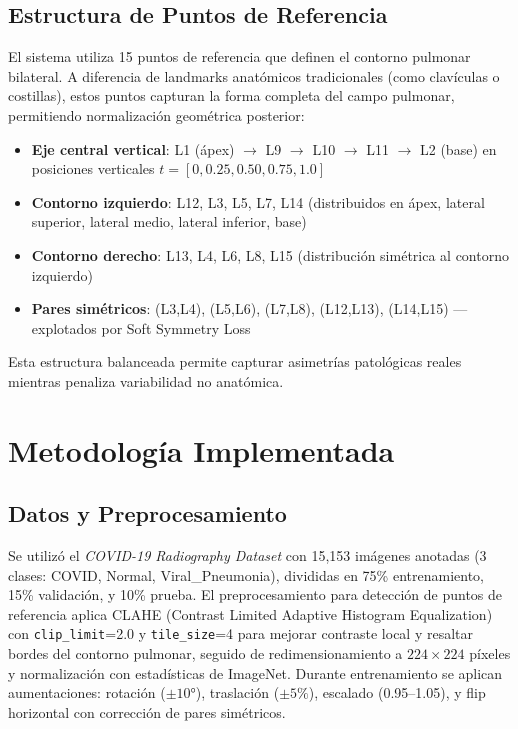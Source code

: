 \documentclass[12pt,a4paper]{article}
\newcommand{\code}[1]{\texttt{#1}}
\begin{document}
\subsection{Estructura de Puntos de Referencia}

El sistema utiliza 15 puntos de referencia que definen el contorno pulmonar bilateral. A diferencia de landmarks anatómicos tradicionales (como clavículas o costillas), estos puntos capturan la forma completa del campo pulmonar, permitiendo normalización geométrica posterior:

\begin{itemize}[itemsep=0pt]
    \item \textbf{Eje central vertical}: L1 (ápex) $\rightarrow$ L9 $\rightarrow$ L10 $\rightarrow$ L11 $\rightarrow$ L2 (base) en posiciones verticales $t=[0, 0.25, 0.50, 0.75, 1.0]$
    \item \textbf{Contorno izquierdo}: L12, L3, L5, L7, L14 (distribuidos en ápex, lateral superior, lateral medio, lateral inferior, base)
    \item \textbf{Contorno derecho}: L13, L4, L6, L8, L15 (distribución simétrica al contorno izquierdo)
    \item \textbf{Pares simétricos}: (L3,L4), (L5,L6), (L7,L8), (L12,L13), (L14,L15) — explotados por Soft Symmetry Loss
\end{itemize}

Esta estructura balanceada permite capturar asimetrías patológicas reales mientras penaliza variabilidad no anatómica.

\section{Metodología Implementada}

\subsection{Datos y Preprocesamiento}

Se utilizó el \textit{COVID-19 Radiography Dataset} con 15,153 imágenes anotadas (3 clases: COVID, Normal, Viral\_Pneumonia), divididas en 75\% entrenamiento, 15\% validación, y 10\% prueba. El preprocesamiento para detección de puntos de referencia aplica CLAHE (Contrast Limited Adaptive Histogram Equalization) con \code{clip\_limit}=2.0 y \code{tile\_size}=4 para mejorar contraste local y resaltar bordes del contorno pulmonar, seguido de redimensionamiento a $224 \times 224$ píxeles y normalización con estadísticas de ImageNet. Durante entrenamiento se aplican aumentaciones: rotación ($\pm 10°$), traslación ($\pm 5\%$), escalado (0.95--1.05), y flip horizontal con corrección de pares simétricos.
\end{document}
